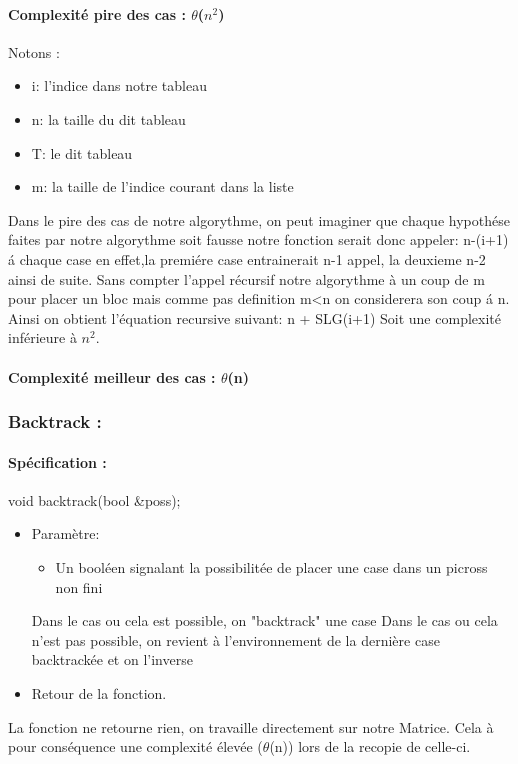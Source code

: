 \documentclass{article}
\begin{document}
\paragraph{Complexit\'e pire des cas : $\theta$($n^2$)\\ }
 Notons :
\begin{itemize}
\item i: l'indice dans notre tableau
\item n: la taille du dit tableau
\item T: le dit tableau
\item m: la taille de l'indice courant dans la liste
\end{itemize}
Dans le pire des cas de notre algorythme, on peut imaginer que chaque hypoth\'ese faites par notre algorythme soit fausse notre fonction serait donc appeler: n-(i+1) \'a chaque case en effet,la premi\'ere case entrainerait n-1 appel, la deuxieme n-2 ainsi de suite.
Sans compter l'appel r\'ecursif notre algorythme \`a un coup de m pour placer un bloc mais comme pas definition m<n on considerera son coup \'a n. Ainsi on obtient l'\'equation recursive suivant:\newline
n + SLG(i+1)
\newline
Soit une complexit\'e inf\'erieure \`a $n^2$.
\paragraph{Complexit\'e meilleur des cas : $\theta$(n)}

\subsubsection{Backtrack :}
\paragraph{Sp\'ecification :}
 void backtrack(bool &poss);
\begin{itemize}
\item Param\`etre:
\begin{itemize}
\item Un booléen signalant la possibilitée de placer une case dans un picross non fini
\end{itemize}
Dans le cas ou cela est possible, on "backtrack" une case
Dans le cas ou cela n'est pas possible, on revient à l'environnement de la dernière case backtrackée et on l'inverse
\item Retour de la fonction.
\end{itemize}
La fonction ne retourne rien, on travaille directement sur notre Matrice.\newline
Cela à pour conséquence une complexité élevée ($\theta$(n)) lors de la recopie de celle-ci.
\end{document}
